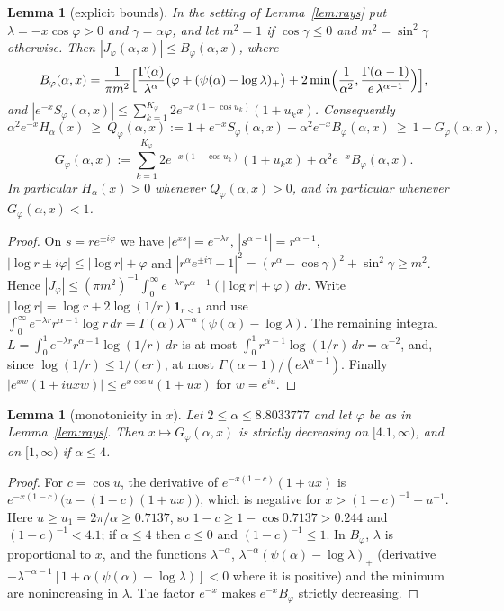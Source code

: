 \documentclass[11pt,a4paper]{article}
\theoremstyle{plain}
\newtheorem{lemma}[theorem]{Lemma}
\theoremstyle{remark}
\begin{document}
\begin{lemma}[explicit bounds]\label{lem:bounds}
In the setting of Lemma~\ref{lem:rays} put $\lambda=-x\cos\varphi>0$ and $\gamma=\alpha\varphi$,
and let $m^2=1$ if $\cos\gamma\le0$ and $m^2=\sin^2\gamma$ otherwise. Then
$|J_\varphi(\alpha,x)|\le B_\varphi(\alpha,x)$, where
\[
 B_\varphi(\alpha,x)=\frac{1}{\pi m^2}\Bigl[\frac{\Gamma(\alpha)}{\lambda^\alpha}
 \bigl(\varphi+(\psi(\alpha)-\log\lambda)_+\bigr)
 +2\min\Bigl(\frac1{\alpha^2},\frac{\Gamma(\alpha-1)}{e\,\lambda^{\alpha-1}}\Bigr)\Bigr],
\]
and $|e^{-x}S_\varphi(\alpha,x)|\le\sum_{k=1}^{K_\varphi}2e^{-x(1-\cos u_k)}(1+u_kx)$.
Consequently
\[
 \alpha^2e^{-x}H_\alpha(x)\ \ge\ Q_\varphi(\alpha,x):=1+e^{-x}S_\varphi(\alpha,x)
 -\alpha^2e^{-x}B_\varphi(\alpha,x)\ \ge\ 1-G_\varphi(\alpha,x),
\]
\[
 G_\varphi(\alpha,x):=\sum_{k=1}^{K_\varphi}2e^{-x(1-\cos u_k)}(1+u_kx)
 +\alpha^2e^{-x}B_\varphi(\alpha,x).
\]
In particular $H_\alpha(x)>0$ whenever $Q_\varphi(\alpha,x)>0$, and in particular whenever
$G_\varphi(\alpha,x)<1$.
\end{lemma}
\begin{proof}
On $s=re^{\pm i\varphi}$ we have $|e^{xs}|=e^{-\lambda r}$, $|s^{\alpha-1}|=r^{\alpha-1}$,
$|\log r\pm i\varphi|\le|\log r|+\varphi$ and
$|r^\alpha e^{\pm i\gamma}-1|^2=(r^\alpha-\cos\gamma)^2+\sin^2\gamma\ge m^2$. Hence
$|J_\varphi|\le(\pi m^2)^{-1}\int_0^\infty e^{-\lambda r}r^{\alpha-1}(|\log r|+\varphi)\,dr$. Write
$|\log r|=\log r+2\log(1/r)\mathbf 1_{r<1}$ and use
$\int_0^\infty e^{-\lambda r}r^{\alpha-1}\log r\,dr=\Gamma(\alpha)\lambda^{-\alpha}(\psi(\alpha)-\log\lambda)$.
The remaining integral $L=\int_0^1e^{-\lambda r}r^{\alpha-1}\log(1/r)\,dr$ is at most
$\int_0^1r^{\alpha-1}\log(1/r)\,dr=\alpha^{-2}$, and, since $\log(1/r)\le 1/(er)$, at most
$\Gamma(\alpha-1)/(e\lambda^{\alpha-1})$. Finally
$|e^{xw}(1+iuxw)|\le e^{x\cos u}(1+ux)$ for $w=e^{iu}$.
\end{proof}

\begin{lemma}[monotonicity in $x$]\label{lem:mono}
Let $2\le\alpha\le8.8033777$ and let $\varphi$ be as in Lemma~\ref{lem:rays}. Then
$x\mapsto G_\varphi(\alpha,x)$ is strictly decreasing on $[4.1,\infty)$, and on $[1,\infty)$ if
$\alpha\le4$.
\end{lemma}
\begin{proof}
For $c=\cos u$, the derivative of $e^{-x(1-c)}(1+ux)$ is $e^{-x(1-c)}\bigl(u-(1-c)(1+ux)\bigr)$,
which is negative for $x>(1-c)^{-1}-u^{-1}$. Here $u\ge u_1=2\pi/\alpha\ge0.7137$, so
$1-c\ge1-\cos0.7137>0.244$ and $(1-c)^{-1}<4.1$; if $\alpha\le4$ then $c\le0$ and $(1-c)^{-1}\le1$.
In $B_\varphi$, $\lambda$ is proportional to $x$, and the functions $\lambda^{-\alpha}$,
$\lambda^{-\alpha}(\psi(\alpha)-\log\lambda)_+$ (derivative
$-\lambda^{-\alpha-1}[1+\alpha(\psi(\alpha)-\log\lambda)]<0$ where it is positive) and the minimum are
nonincreasing in $\lambda$. The factor $e^{-x}$ makes $e^{-x}B_\varphi$ strictly decreasing.
\end{proof}
\end{document}
